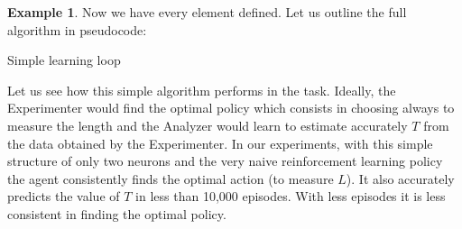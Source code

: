 \documentclass[11pt,a4paper,twoside]{report}
\DeclareMathOperator*{\argmax}{arg\,max}
\newcommand{\+}{\textnormal{+} }
\theoremstyle{definition}
\newtheorem{myex}[mythm]{Example}
\numberwithin{equation}{chapter}
\begin{document}
\begin{myex}
Now we have every element defined. Let us outline the full algorithm in 
pseudocode:

  \makeatletter
  \def\BState{\State\hskip-\ALG@thistlm}
  \makeatother
  \begin{algorithm}
    \caption{Simple learning loop}\label{pendulum}
    \end{algorithm}
\end{myex}

Let us see how this simple algorithm performs in the task. Ideally, the
Experimenter would find the optimal policy which consists in choosing always to
measure the length and the Analyzer would learn to estimate accurately $T$ from
the data obtained by the Experimenter. In our experiments, with this simple
structure of only two neurons and the very naive reinforcement learning policy
the agent consistently finds the optimal action (to measure $L$). It also
accurately predicts the value of $T$ in less than 10,000 episodes. With less
episodes it is less consistent in finding the optimal policy.
\end{document}
